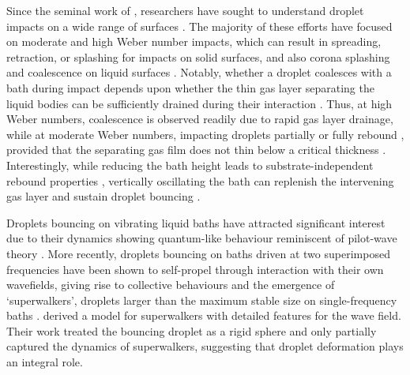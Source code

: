 \documentclass{jfm}
\begin{document}
Since the seminal work of \citet{Worthington1882}, researchers have sought to understand droplet impacts on a wide range of surfaces \citep{Josserand2016-2AnnualReviews,REIN199361}. The majority of these efforts have focused on moderate and high Weber number impacts, which can result in spreading, retraction, or splashing \citep{Yarin2006} for impacts on solid surfaces, and also corona splashing and coalescence on liquid surfaces \citep{highspeed_thoroddsen_2008,kavehpour2015,Burzynski_Roisman_Bansmer_2020}. Notably, whether a droplet coalesces with a bath during impact depends upon whether the thin gas layer separating the liquid bodies can be sufficiently drained during their interaction  \citep{CouderEtAl2005Noncoalescence,Yarin2006,kavehpour2015}. Thus, at high Weber numbers, coalescence is observed readily due to rapid gas layer drainage, while at moderate Weber numbers, impacting droplets partially or fully rebound \citep{AlventosaEtAl2023,Burzynski_Roisman_Bansmer_2020}, provided that the separating gas film does not thin below a critical thickness \citep{sprittles2024dropbounces, SprittlesImpact2020}. Interestingly, while reducing the bath height leads to substrate-independent rebound properties \citep{sanjay_jfm_2023,GabbardEtAl2025}, vertically oscillating  the bath can replenish the intervening gas layer and sustain droplet bouncing \citep{CouderEtAl2005Noncoalescence}. 

Droplets bouncing on vibrating liquid baths have attracted significant interest due to their dynamics showing quantum-like behaviour reminiscent of pilot-wave theory \citep{BushAndOza2020}. More recently, droplets bouncing on baths driven at two superimposed frequencies have been shown to self-propel through interaction with their own wavefields, giving rise to collective behaviours and the emergence of `superwalkers’, droplets larger than the maximum stable size on single-frequency baths \citep{ValaniEtAl2019}. \citet{Galeano-RiosEtAl2019} derived a model for superwalkers with detailed features for the wave field. Their work treated the bouncing droplet as a rigid sphere and only partially captured the dynamics of superwalkers, suggesting that droplet deformation plays an integral role. 
\end{document}
